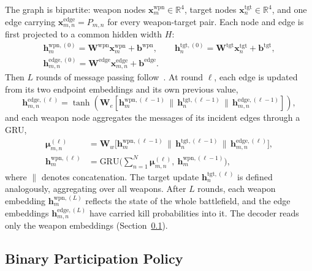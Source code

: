 The graph is bipartite: weapon nodes $\bm{x}_m^{\text{wpn}} \in \mathbb{R}^4$, target nodes $\bm{x}_n^{\text{tgt}} \in \mathbb{R}^4$, and one edge carrying $\bm{x}_{m,n}^{\text{edge}} = P_{m,n}$ for every weapon-target pair. Each node and edge is first projected to a common hidden width $H$:
\begin{equation}
\label{eq:gnn-proj}
\begin{gathered}
\bm{h}_m^{\text{wpn},(0)} = \bm{W}^{\text{wpn}}\bm{x}_m^{\text{wpn}} + \bm{b}^{\text{wpn}}, \qquad
\bm{h}_n^{\text{tgt},(0)} = \bm{W}^{\text{tgt}}\bm{x}_n^{\text{tgt}} + \bm{b}^{\text{tgt}}, \\
\bm{h}_{m,n}^{\text{edge},(0)} = \bm{W}^{\text{edge}}\bm{x}_{m,n}^{\text{edge}} + \bm{b}^{\text{edge}}.
\end{gathered}
\end{equation}
Then $L$ rounds of message passing follow~\cite{gilmer2017neural}. At round $\ell$, each edge is updated from its two endpoint embeddings and its own previous value,
\begin{equation}
\label{eq:gnn-edge}
\bm{h}_{m,n}^{\text{edge},(\ell)} = \tanh\!\left(\bm{W}_e\left[\bm{h}_m^{\text{wpn},(\ell-1)} \,\|\, \bm{h}_n^{\text{tgt},(\ell-1)} \,\|\, \bm{h}_{m,n}^{\text{edge},(\ell-1)}\right]\right),
\end{equation}
and each weapon node aggregates the messages of its incident edges through a GRU,
\begin{equation}
\label{eq:gnn-node}
\begin{aligned}
\bm{\mu}_{m,n}^{(\ell)} &= \bm{W}_w\big[\bm{h}_m^{\text{wpn},(\ell-1)} \,\|\, \bm{h}_n^{\text{tgt},(\ell-1)} \,\|\, \bm{h}_{m,n}^{\text{edge},(\ell)}\big],\\
\bm{h}_m^{\text{wpn},(\ell)} &= \text{GRU}\Big(\textstyle\sum_{n=1}^{N} \bm{\mu}_{m,n}^{(\ell)},\ \bm{h}_m^{\text{wpn},(\ell-1)}\Big),
\end{aligned}
\end{equation}
where $\|$ denotes concatenation. The target update $\bm{h}_n^{\text{tgt},(\ell)}$ is defined analogously, aggregating over all weapons. After $L$ rounds, each weapon embedding $\bm{h}_m^{\text{wpn},(L)}$ reflects the state of the whole battlefield, and the edge embeddings $\bm{h}_{m,n}^{\text{edge},(L)}$ have carried kill probabilities into it. The decoder reads only the weapon embeddings (Section~\ref{sec:parallel-decoder}).


\subsection{Binary Participation Policy}
\label{sec:parallel-decoder}

